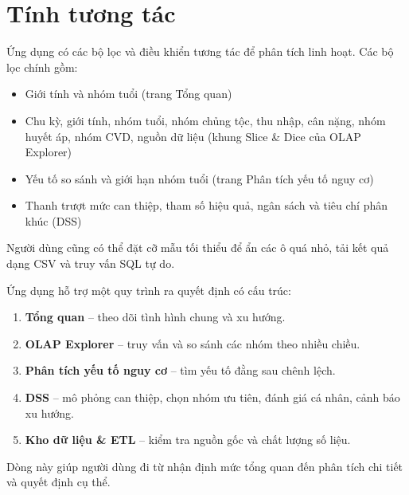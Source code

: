 \section{Tính tương tác}
Ứng dụng có các bộ lọc và điều khiển tương tác để phân tích linh hoạt. Các bộ lọc chính gồm:
\begin{itemize}
\item Giới tính và nhóm tuổi (trang Tổng quan)
\item Chu kỳ, giới tính, nhóm tuổi, nhóm chủng tộc, thu nhập, cân nặng, nhóm huyết áp, nhóm CVD, nguồn dữ liệu (khung Slice \& Dice của OLAP Explorer)
\item Yếu tố so sánh và giới hạn nhóm tuổi (trang Phân tích yếu tố nguy cơ)
\item Thanh trượt mức can thiệp, tham số hiệu quả, ngân sách và tiêu chí phân khúc (DSS)
\end{itemize}
Người dùng cũng có thể đặt cỡ mẫu tối thiểu để ẩn các ô quá nhỏ, tải kết quả dạng CSV và truy vấn SQL tự do.

Ứng dụng hỗ trợ một quy trình ra quyết định có cấu trúc:
\begin{enumerate}
\item \textbf{Tổng quan} -- theo dõi tình hình chung và xu hướng.
\item \textbf{OLAP Explorer} -- truy vấn và so sánh các nhóm theo nhiều chiều.
\item \textbf{Phân tích yếu tố nguy cơ} -- tìm yếu tố đằng sau chênh lệch.
\item \textbf{DSS} -- mô phỏng can thiệp, chọn nhóm ưu tiên, đánh giá cá nhân, cảnh báo xu hướng.
\item \textbf{Kho dữ liệu \& ETL} -- kiểm tra nguồn gốc và chất lượng số liệu.
\end{enumerate}
Dòng này giúp người dùng đi từ nhận định mức tổng quan đến phân tích chi tiết và quyết định cụ thể.

